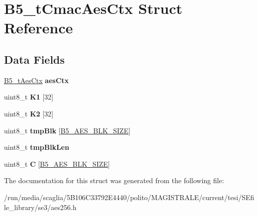 \hypertarget{struct_b5__t_cmac_aes_ctx}{\section{B5\-\_\-t\-Cmac\-Aes\-Ctx Struct Reference}
\label{struct_b5__t_cmac_aes_ctx}
}
\subsection*{Data Fields}
\begin{DoxyCompactItemize}
\item 
\hypertarget{struct_b5__t_cmac_aes_ctx_a434f147b67e07047c1f1249690c0d893}{\hyperlink{struct_b5__t_aes_ctx}{B5\-\_\-t\-Aes\-Ctx} {\bfseries aes\-Ctx}}\label{struct_b5__t_cmac_aes_ctx_a434f147b67e07047c1f1249690c0d893}

\item 
\hypertarget{struct_b5__t_cmac_aes_ctx_a9e33af19b1c46ab59918427a9b6bdf25}{uint8\-\_\-t {\bfseries K1} \mbox{[}32\mbox{]}}\label{struct_b5__t_cmac_aes_ctx_a9e33af19b1c46ab59918427a9b6bdf25}

\item 
\hypertarget{struct_b5__t_cmac_aes_ctx_a98481bd172eb8e272138a9d65b1055e9}{uint8\-\_\-t {\bfseries K2} \mbox{[}32\mbox{]}}\label{struct_b5__t_cmac_aes_ctx_a98481bd172eb8e272138a9d65b1055e9}

\item 
\hypertarget{struct_b5__t_cmac_aes_ctx_aec9d84dff64a14d738e0efb61a81513f}{uint8\-\_\-t {\bfseries tmp\-Blk} \mbox{[}\hyperlink{group__aes_keys_ga64a33b32fc1ab72a27a36a63a66c5774}{B5\-\_\-\-A\-E\-S\-\_\-\-B\-L\-K\-\_\-\-S\-I\-Z\-E}\mbox{]}}\label{struct_b5__t_cmac_aes_ctx_aec9d84dff64a14d738e0efb61a81513f}

\item 
\hypertarget{struct_b5__t_cmac_aes_ctx_ace95cf28ee71378dbe10a6e4e4a7e116}{uint8\-\_\-t {\bfseries tmp\-Blk\-Len}}\label{struct_b5__t_cmac_aes_ctx_ace95cf28ee71378dbe10a6e4e4a7e116}

\item 
\hypertarget{struct_b5__t_cmac_aes_ctx_a982a5dfe1d71dc3371e52b83021438e0}{uint8\-\_\-t {\bfseries C} \mbox{[}\hyperlink{group__aes_keys_ga64a33b32fc1ab72a27a36a63a66c5774}{B5\-\_\-\-A\-E\-S\-\_\-\-B\-L\-K\-\_\-\-S\-I\-Z\-E}\mbox{]}}\label{struct_b5__t_cmac_aes_ctx_a982a5dfe1d71dc3371e52b83021438e0}

\end{DoxyCompactItemize}


The documentation for this struct was generated from the following file\-:\begin{DoxyCompactItemize}
\item 
/run/media/scaglia/5\-B106\-C33792\-E4440/polito/\-M\-A\-G\-I\-S\-T\-R\-A\-L\-E/current/tesi/\-S\-Efile\-\_\-library/se3/aes256.\-h\end{DoxyCompactItemize}
